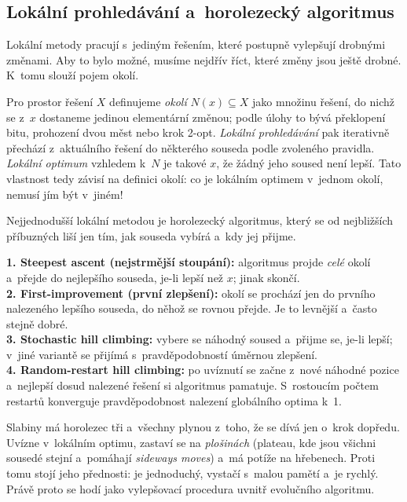 \documentclass[11pt,a4paper]{article}
\theoremstyle{definition}
\begin{document}
\subsection{Lokální prohledávání a~horolezecký algoritmus}

Lokální metody pracují s~jediným řešením, které postupně vylepšují drobnými změnami.
Aby to bylo možné, musíme nejdřív říct, které změny jsou ještě drobné. K~tomu slouží
pojem okolí.

\begin{defbox}
Pro prostor řešení $X$ definujeme \emph{okolí} $N(x) \subseteq X$ jako množinu řešení,
do nichž se z~$x$ dostaneme jedinou elementární změnou; podle úlohy to bývá překlopení
bitu, prohození dvou měst nebo krok 2-opt. \emph{Lokální prohledávání} pak iterativně
přechází z~aktuálního řešení do některého souseda podle zvoleného pravidla.
\emph{Lokální optimum} vzhledem k~$N$ je takové $x$, že žádný jeho soused není lepší.
Tato vlastnost tedy závisí na definici okolí: co je lokálním optimem v~jednom okolí,
nemusí jím být v~jiném!
\end{defbox}

Nejjednodušší lokální metodou je horolezecký algoritmus, který se od nejbližších
příbuzných liší jen tím, jak souseda vybírá a~kdy jej přijme.

\begin{defbox}
\textbf{1. Steepest ascent (nejstrmější stoupání):} algoritmus projde \emph{celé} okolí
a~přejde do nejlepšího souseda, je-li lepší než $x$; jinak skončí.\\
\textbf{2. First-improvement (první zlepšení):} okolí se prochází jen do prvního
nalezeného lepšího souseda, do něhož se rovnou přejde. Je to levnější a~často stejně
dobré.\\
\textbf{3. Stochastic hill climbing:} vybere se náhodný soused a~přijme se, je-li lepší;
v~jiné variantě se přijímá s~pravděpodobností úměrnou zlepšení.\\
\textbf{4. Random-restart hill climbing:} po uvíznutí se začne z~nové náhodné pozice
a~nejlepší dosud nalezené řešení si algoritmus pamatuje. S~rostoucím počtem restartů
konverguje pravděpodobnost nalezení globálního optima k~1.
\end{defbox}

Slabiny má horolezec tři a~všechny plynou z~toho, že se dívá jen o~krok dopředu. Uvízne
v~lokálním optimu, zastaví se na \emph{plošinách} (plateau, kde jsou všichni sousedé
stejní a~pomáhají \emph{sideways moves}) a~má potíže na hřebenech. Proti tomu stojí jeho
přednosti: je jednoduchý, vystačí s~malou pamětí a~je rychlý. Právě proto se hodí jako
vylepšovací procedura uvnitř evolučního algoritmu.
\end{document}
